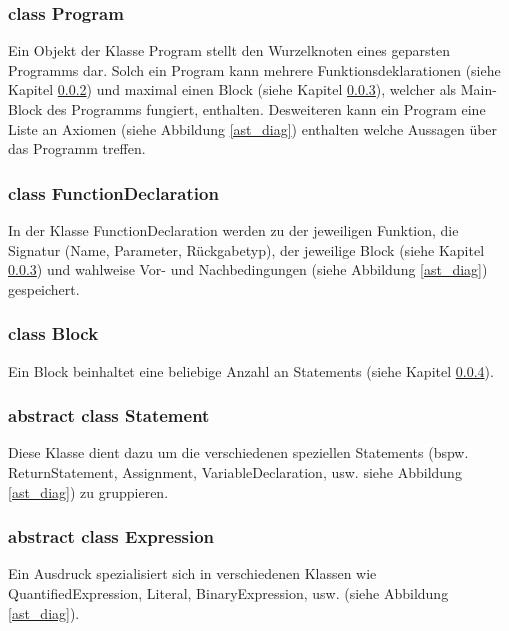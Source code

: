 \begin{landscape}
\subsubsection{class Program}
Ein Objekt der Klasse Program stellt den Wurzelknoten eines geparsten Programms dar. Solch ein Program kann mehrere Funktionsdeklarationen (siehe Kapitel \ref{astfunctiondecl_class}) und maximal einen Block (siehe Kapitel \ref{astblock_class}), welcher als Main-Block des Programms fungiert, enthalten. Desweiteren kann ein Program eine Liste an Axiomen (siehe Abbildung \ref{ast_diag}) enthalten welche Aussagen über das Programm treffen.

\subsubsection{class FunctionDeclaration}
\label{astfunctiondecl_class}
In der Klasse FunctionDeclaration werden zu der jeweiligen Funktion, die Signatur (Name, Parameter, Rückgabetyp), der jeweilige Block (siehe Kapitel \ref{astblock_class}) und wahlweise Vor- und Nachbedingungen (siehe Abbildung \ref{ast_diag}) gespeichert.

\subsubsection{class Block}
\label{astblock_class}
Ein Block beinhaltet eine beliebige Anzahl an Statements (siehe Kapitel \ref{aststatement_class}).

\subsubsection{abstract class Statement}
\label{aststatement_class}
Diese Klasse dient dazu um die verschiedenen speziellen Statements (bspw. ReturnStatement, Assignment, VariableDeclaration, usw. siehe Abbildung \ref{ast_diag}) zu gruppieren.

\subsubsection{abstract class Expression}
\label{astexpr_class}
Ein Ausdruck spezialisiert sich in verschiedenen Klassen wie QuantifiedExpression, Literal, BinaryExpression, usw. (siehe Abbildung \ref{ast_diag}).


\end{landscape}
